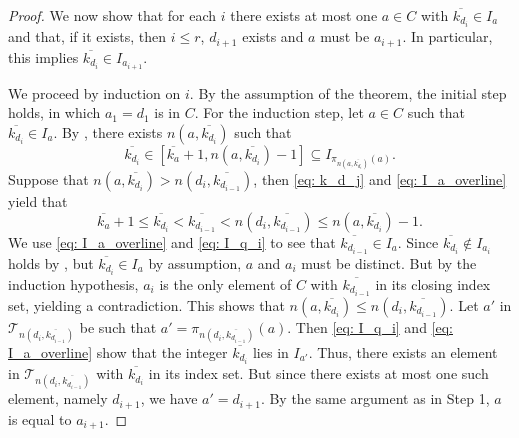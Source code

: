 \documentclass[10pt,a4paper]{amsart}
\newcommand{\cT}{\mathcal{T}}
\begin{document}
\begin{proof}
     We now show that for each $i$ there exists at most one $a \in C$ with $\overline{k_{d_i}} \in I_a$ and that, if it exists, then $i\leq r$, $d_{i+1}$ exists and $a$ must be $a_{i+1}$. In particular, this implies $\overline{k_{d_i}} \in I_{a_{i+1}}$.

    We proceed by induction on $i$. By the assumption of the theorem, the initial step holds, in which $a_1=d_1$ is in $C$. For the induction step, let $a \in C$ such that $\overline{k_{d_i}} \in I_a$. By , there exists $n(a,\overline{k_{d_i}})$ such that
    \begin{equation}\label{eq: I_a_overline}
        \overline{k_{d_i}} \in [\overline{k_a}+1,n(a,\overline{k_{d_i}})-1] \subseteq I_{\pi_{n(a,\overline{k_{d_i}})}(a)}.    
    \end{equation}
    Suppose that $n(a,\overline{k_{d_i}}) > n(d_i,\overline{k_{d_{i-1}}})$, then \eqref{eq: k_d_j} and \eqref{eq: I_a_overline} yield that
    $$
        \overline{k_a}+1 \leq \overline{k_{d_i}} < \overline{k_{d_{i-1}}} < n(d_i,\overline{k_{d_{i-1}}}) \leq n(a,\overline{k_{d_i}})-1.
    $$
    We use \eqref{eq: I_a_overline} and \eqref{eq: I_q_i} to see that $\overline{k_{d_{i-1}}} \in I_a$. Since $\overline{k_{d_i}} \notin I_{a_i}$ holds by , but $\overline{k_{d_i}} \in I_a$ by assumption, $a$ and $a_i$ must be distinct. But by the induction hypothesis, $a_i$ is the only element of $C$ with $\overline{k_{d_{i-1}}}$ in its closing index set, yielding a contradiction. This shows that $n(a,\overline{k_{d_i}}) \leq n(d_i,\overline{k_{d_{i-1}}})$. Let $a'$ in $\cT_{n(d_i,\overline{k_{d_{i-1}}})}$ be such that $a' = \pi_{n(d_i,\overline{k_{d_{i-1}}})}(a)$. Then \eqref{eq: I_q_i} and \eqref{eq: I_a_overline} show that the integer $\overline{k_{d_i}}$ lies in $I_{a'}$. Thus, there exists an element in $\cT_{n(d_i,\overline{k_{d_{i-1}}})}$ with $\overline{k_{d_i}}$ in its index set. But since there exists at most one such element, namely $d_{i+1}$, we have $a'=d_{i+1}$. By the same argument as in {\sf Step 1}, $a$ is equal to $a_{i+1}$.


\end{proof}
\end{document}
